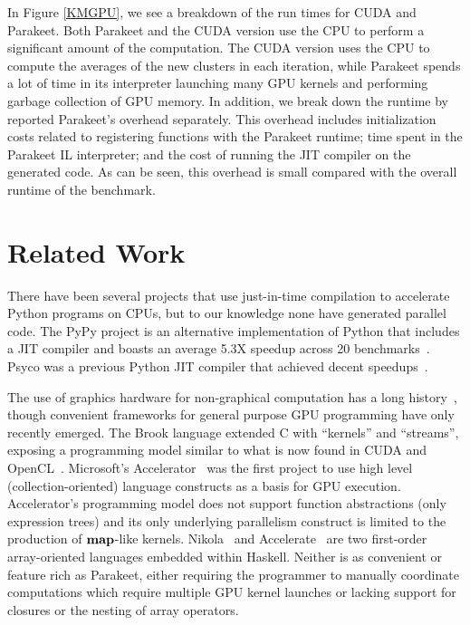 \documentclass[10pt,twocolumn]{article}
\begin{document}
In Figure \ref{KMGPU}, we see a breakdown of the run times for CUDA and Parakeet.  Both Parakeet and the CUDA version use the CPU to perform a significant amount of the computation.  The CUDA version uses the CPU to compute the averages of the new clusters in each iteration, while Parakeet spends a lot of time in its interpreter launching many GPU kernels and performing garbage collection of GPU memory.  In addition, we break down the runtime by reported Parakeet's overhead separately.  This overhead includes initialization costs related to registering functions with the Parakeet runtime; time spent in the Parakeet IL interpreter; and the cost of running the JIT compiler on the generated code.  As can be seen, this overhead is small compared with the overall runtime of the benchmark.

\section{Related Work}
\label{RelatedWork}
There have been several projects that use just-in-time compilation to accelerate Python programs on CPUs, but to our knowledge none have generated parallel code.  The PyPy project is an alternative implementation of Python that includes a JIT compiler and boasts an average 5.3X speedup across 20 benchmarks~\cite{Rigo06}. Psyco was a previous Python JIT compiler that achieved decent speedups~\cite{Rigo04}.

The use of graphics hardware for non-graphical computation has a long history~\cite{Leng90}, though convenient frameworks for general purpose GPU programming have only recently emerged. The Brook language extended C with ``kernels'' and ``streams'', exposing a programming model similar to what is now found in CUDA and OpenCL~\cite{Buck04}.  Microsoft's Accelerator~\cite{Tard06} was the first project to use high level (collection-oriented) language constructs as a basis for GPU execution. Accelerator's programming model does not support function abstractions (only expression trees) and its only underlying parallelism construct is limited to the production of $\mbox{\textbf{map}}$-like kernels.  Nikola~\cite{Main10} and Accelerate~\cite{Chak11} are two first-order array-oriented languages embedded within Haskell. Neither is as convenient or feature rich as Parakeet, either requiring the programmer to manually coordinate computations which require multiple GPU kernel launches or lacking support for closures or the nesting of array operators.
\end{document}
